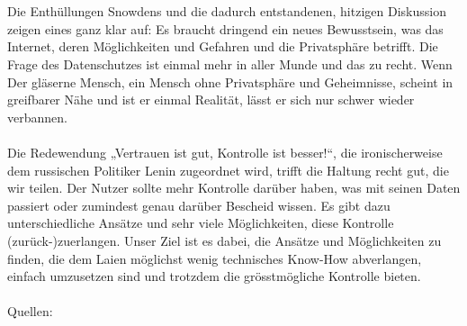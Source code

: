 \\
\\
Die Enthüllungen Snowdens und die dadurch entstandenen, hitzigen Diskussion zeigen eines ganz klar auf: Es braucht dringend ein neues Bewusstsein, was das Internet, deren Möglichkeiten und Gefahren und die Privatsphäre betrifft. Die Frage des Datenschutzes ist einmal mehr in aller Munde und das zu recht. Wenn  Der gläserne Mensch, ein Mensch ohne Privatsphäre und Geheimnisse, scheint in greifbarer Nähe und ist er einmal Realität, lässt er sich nur schwer wieder verbannen.
\\
\\
Die Redewendung „Vertrauen ist gut, Kontrolle ist besser!“, die ironischerweise dem russischen Politiker Lenin zugeordnet wird, trifft die Haltung recht gut, die wir teilen. Der Nutzer sollte mehr Kontrolle darüber haben, was mit seinen Daten passiert oder zumindest genau darüber Bescheid wissen. Es gibt dazu unterschiedliche Ansätze und sehr viele Möglichkeiten, diese Kontrolle (zurück-)zuerlangen. Unser Ziel ist es dabei, die Ansätze und Möglichkeiten zu finden, die dem Laien möglichst wenig technisches Know-How abverlangen, einfach umzusetzen sind und trotzdem die grösstmögliche Kontrolle bieten.
\\
\\Quellen:
